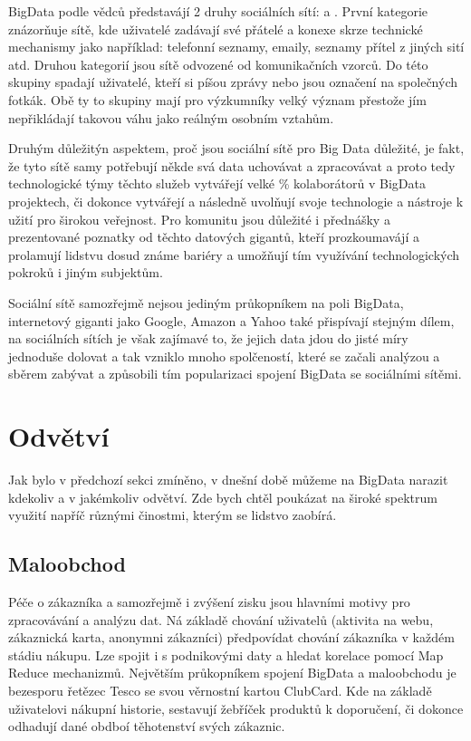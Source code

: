 BigData podle vědců představájí 2 druhy sociálních sítí:  a . První kategorie znázorňuje sítě, kde uživatelé zadávají své přátelé a konexe skrze technické mechanismy jako například: telefonní seznamy, emaily, seznamy přítel z jiných sití atd. Druhou kategorií jsou sítě odvozené od komunikačních vzorců. Do této skupiny spadají uživatelé, kteří si píšou zprávy nebo jsou označení na společných fotkák. Obě ty to skupiny mají pro výzkumníky velký význam přestože jím nepřikládají takovou váhu jako reálným osobním vztahům. \cite{social}

Druhým důležitýn aspektem, proč jsou sociální sítě pro Big Data důležité, je fakt, že tyto sítě samy potřebují někde svá data uchovávat a zpracovávat a proto tedy technologické týmy těchto služeb vytvářejí velké \% kolaborátorů v BigData projektech, či dokonce vytvářejí a následně uvolňují svoje technologie a nástroje k užití pro širokou veřejnost. Pro komunitu jsou důležité i přednášky a prezentované poznatky od těchto datových gigantů, kteří prozkoumavájí a prolamují lidstvu dosud známe bariéry a umožňují tím využívání technologických pokroků i jiným subjektům. 

Sociální sítě samozřejmě nejsou jediným průkopníkem na poli BigData, internetový giganti jako Google, Amazon a Yahoo také přispívají stejným dílem, na sociálních sítích je však zajímavé to, že jejich data jdou do jisté míry jednoduše dolovat a tak vzniklo mnoho spolčeností, které se začali analýzou a sběrem zabývat a způsobili tím popularizaci spojení BigData se sociálními sítěmi. 


\section{Odvětví}

Jak bylo v předchozí sekci zmíněno, v dnešní době můžeme na BigData narazit kdekoliv a v jakémkoliv odvětví. Zde bych chtěl poukázat na široké spektrum využití napříč různými činostmi, kterým se lidstvo zaobírá.\cite{sektory}

\subsection{Maloobchod}
Péče o zákazníka a samozřejmě i zvýšení zisku jsou hlavními motivy pro zpracovávání a analýzu dat. Ná základě chování uživatelů (aktivita na webu, zákaznická karta, anonymni zákazníci) předpovídat chování zákazníka v každém stádiu nákupu. Lze spojit i s podnikovými daty a hledat korelace pomocí Map Reduce mechanizmů. Největším průkopníkem spojení BigData a maloobchodu je bezesporu řetězec Tesco se svou věrnostní kartou ClubCard. Kde na základě uživatelovi nákupní historie, sestavují žebříček produktů k doporučení, či dokonce odhadují dané obdboí těhotenství svých zákaznic.\cite{tesco}

